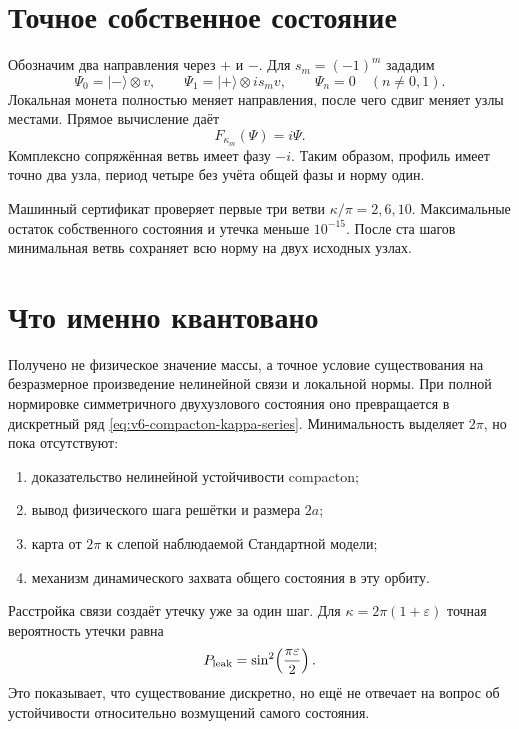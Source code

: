 \section{Точное собственное состояние}

Обозначим два направления через $+$ и $-$. Для
$s_m=(-1)^m$ зададим
\begin{equation}
 \Psi_0=|-\rangle\otimes v,
 \qquad
 \Psi_1=|+\rangle\otimes i s_m v,
 \qquad
 \Psi_n=0\quad(n\ne0,1).
 \label{eq:v6-two-site-compacton}
\end{equation}
Локальная монета полностью меняет направления, после чего сдвиг меняет
узлы местами. Прямое вычисление даёт
\begin{equation}
 F_{\kappa_m}(\Psi)=i\Psi.
 \label{eq:v6-compacton-eigenphase}
\end{equation}
Комплексно сопряжённая ветвь имеет фазу $-i$. Таким образом, профиль имеет
точно два узла, период четыре без учёта общей фазы и норму один.

Машинный сертификат проверяет первые три ветви
$\kappa/\pi=2,6,10$. Максимальные остаток собственного состояния и утечка
меньше $10^{-15}$. После ста шагов минимальная ветвь сохраняет всю норму на
двух исходных узлах.

\section{Что именно квантовано}

Получено не физическое значение массы, а точное условие существования на
безразмерное произведение нелинейной связи и локальной нормы. При полной
нормировке симметричного двухузлового состояния оно превращается в
дискретный ряд \eqref{eq:v6-compacton-kappa-series}. Минимальность выделяет
$2\pi$, но пока отсутствуют:
\begin{enumerate}
 \item доказательство нелинейной устойчивости compacton;
 \item вывод физического шага решётки и размера $2a$;
 \item карта от $2\pi$ к слепой наблюдаемой Стандартной модели;
 \item механизм динамического захвата общего состояния в эту орбиту.
\end{enumerate}

Расстройка связи создаёт утечку уже за один шаг. Для
$\kappa=2\pi(1+\varepsilon)$ точная вероятность утечки равна
\begin{equation}
 P_{\rm leak}=\sin^2\!\left(\frac{\pi\varepsilon}{2}\right).
 \label{eq:v6-compacton-detuning-leakage}
\end{equation}
Это показывает, что существование дискретно, но ещё не отвечает на вопрос
об устойчивости относительно возмущений самого состояния.

